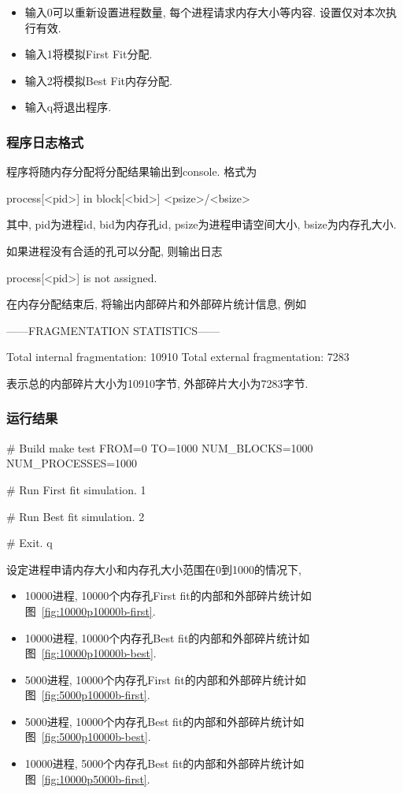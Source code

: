 \begin{itemize}
    \item 输入0可以重新设置进程数量, 每个进程请求内存大小等内容. 设置仅对本次执行有效.
    \item 输入1将模拟First Fit分配.
    \item 输入2将模拟Best Fit内存分配.
    \item 输入q将退出程序.
\end{itemize}

\subsubsection{程序日志格式}
程序将随内存分配将分配结果输出到console. 格式为
\begin{code}
    process[<pid>] in block[<bid>] <psize>/<bsize>
\end{code}
其中, pid为进程id, bid为内存孔id, psize为进程申请空间大小, bsize为内存孔大小.\par

如果进程没有合适的孔可以分配, 则输出日志
\begin{code}
    process[<pid>] is not assigned.
\end{code}

在内存分配结束后, 将输出内部碎片和外部碎片统计信息, 例如
\begin{code}
    ------FRAGMENTATION STATISTICS------

    Total internal fragmentation: 10910
    Total external fragmentation: 7283
\end{code}
表示总的内部碎片大小为10910字节, 外部碎片大小为7283字节.

\subsubsection{运行结果}

\begin{code}
    # Build
    make test FROM=0 TO=1000 NUM_BLOCKS=1000 NUM_PROCESSES=1000

    # Run First fit simulation.
    1

    # Run Best fit simulation.
    2

    # Exit.
    q
\end{code}

设定进程申请内存大小和内存孔大小范围在0到1000的情况下,
\begin{itemize}
    \item 10000进程, 10000个内存孔First fit的内部和外部碎片统计如图~\ref{fig:10000p10000b-first}.
    \item 10000进程, 10000个内存孔Best fit的内部和外部碎片统计如图~\ref{fig:10000p10000b-best}.
    \item 5000进程, 10000个内存孔First fit的内部和外部碎片统计如图~\ref{fig:5000p10000b-first}.
    \item 5000进程, 10000个内存孔Best fit的内部和外部碎片统计如图~\ref{fig:5000p10000b-best}.
    \item 10000进程, 5000个内存孔Best fit的内部和外部碎片统计如图~\ref{fig:10000p5000b-first}.
\end{itemize}

